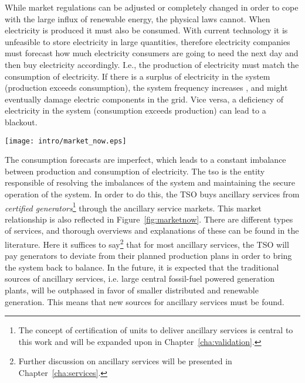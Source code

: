 While market regulations can be adjusted or completely changed in order to cope with the large influx of renewable energy, the physical laws cannot.
When electricity is produced it must also be consumed. With current technology it is unfeasible to store electricity in large quantities, therefore electricity companies must forecast how much electricity consumers are going to need the next day and then buy electricity accordingly. I.e., the production of electricity must match the consumption of electricity. If there is a surplus of electricity in the system (production exceeds consumption), the system frequency increases%
, and might eventually damage electric components in the grid. Vice versa, a deficiency of electricity in the system (consumption exceeds production) can lead to a blackout. 
\begin{figure*}[htbp!]
		\centering
		\caption{The actors and relationships in the power market today. Note that the consumer buys electricity from a retailer, but has no further contact to the other market actors, i.e. the consumer has a passive role in the system.}\label{fig:marketnow}
	\texttt{[image: intro/market\_now.eps]}
\end{figure*}

The consumption forecasts are imperfect, which leads to a constant imbalance between production and consumption of electricity. The \gls{tso} is the entity responsible of resolving the imbalances of the system and maintaining the secure operation of the system. In order to do this, the TSO buys ancillary services from \emph{certified generators}\footnote[][-2\baselineskip]{The concept of certification of units to deliver ancillary services is central to this work and will be expanded upon in Chapter~\ref{cha:validation}.}  through the ancillary service markets. This market relationship is also reflected in Figure~\ref{fig:marketnow}. There are different types of services, and thorough overviews and explanations of these can be found in the literature. Here it suffices to say\footnote{Further discussion on ancillary services will be presented in Chapter~\ref{cha:services}.} that for most ancillary services, the TSO will pay generators to deviate from their planned production plans in order to bring the system back to balance. In the future, it is expected that the traditional sources of ancillary services, i.e. large central fossil-fuel powered generation plants, will be outphased in favor of smaller distributed and renewable generation. This means that new sources for ancillary services must be found.  
